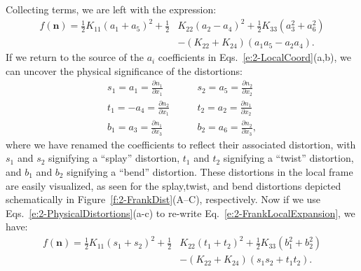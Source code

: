 Collecting terms, we are left with the expression:
\begin{align}
  f(\mathbf{n}) = \frac{1}{2}K_{11} (a_1 + a_5)^2 + \frac{1}{2}&K_{22} (a_2 - a_4)^2 + \frac{1}{2}K_{33} (a_3^2 + a_6^2) \nonumber \\
    &- (K_{22} + K_{24}) (a_1 a_5 - a_2 a_4).\label{e:2-FrankLocalExpansion}
\end{align}
If we return to the source of the $a_i$ coefficients in Eqs.~\ref{e:2-LocalCoord}(a,b), we can uncover the physical significance of the distortions:
\label{e:2-PhysicalDistortions}
\begin{align}
  s_1 = a_1 = \frac{\partial n_1}{\partial x_1} \quad & \quad s_2 = a_5 = \frac{\partial n_2}{\partial x_2} \tag{\theequation a} \\
  t_1 = - a_4 = \frac{\partial n_2}{\partial x_1} \quad & \quad t_2 = a_2 = \frac{\partial n_1}{\partial x_2} \tag{\theequation b} \\
  b_1 =  a_3 = \frac{\partial n_1}{\partial x_3} \quad & \quad b_2 = a_6 = \frac{\partial n_2}{\partial x_3}, \tag{\theequation c}
\end{align}
where we have renamed the coefficients to reflect their associated distortion, with $s_1$ and $s_2$ signifying a ``splay'' distortion, $t_1$ and $t_2$ signifying a ``twist'' distortion, and $b_1$ and $b_2$ signifying a ``bend'' distortion.
These distortions in the local frame are easily visualized, as seen for the splay,twist, and bend distortions depicted schematically in Figure~\ref{f:2-FrankDist}(A--C), respectively.
Now if we use Eqs.~\ref{e:2-PhysicalDistortions}(a-c) to re-write Eq.~\ref{e:2-FrankLocalExpansion}, we have:
\begin{align}
  f(\mathbf{n}) = \frac{1}{2}K_{11} (s_1 + s_2)^2 + \frac{1}{2}&K_{22} (t_1 + t_2)^2 + \frac{1}{2}K_{33} (b_1^2 + b_2^2) \nonumber \\
    & - (K_{22} + K_{24}) (s_1 s_2 + t_1 t_2).\label{e:2-FrankPhysicalExpansion}
\end{align}

